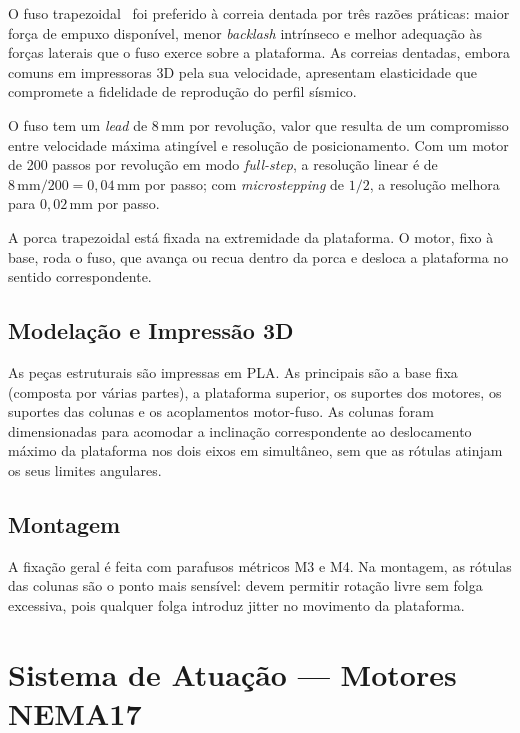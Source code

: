 O fuso trapezoidal~\cite{Fillment3DVarao} foi preferido à correia dentada por três razões práticas: maior força de empuxo disponível, menor \textit{backlash} intrínseco e melhor adequação às forças laterais que o fuso exerce sobre a plataforma. As correias dentadas, embora comuns em impressoras 3D pela sua velocidade, apresentam elasticidade que compromete a fidelidade de reprodução do perfil sísmico.

O fuso tem um \textit{lead} de 8\,mm por revolução, valor que resulta de um compromisso entre velocidade máxima atingível e resolução de posicionamento. Com um motor de 200 passos por revolução em modo \textit{full-step}, a resolução linear é de $8\,\text{mm} / 200 = 0{,}04\,\text{mm}$ por passo; com \textit{microstepping} de $1/2$, a resolução melhora para $0{,}02\,\text{mm}$ por passo.

A porca trapezoidal está fixada na extremidade da plataforma. O motor, fixo à base, roda o fuso, que avança ou recua dentro da porca e desloca a plataforma no sentido correspondente.


\subsection{Modelação e Impressão 3D}
\label{subsec:modelacao-3d}

As peças estruturais são impressas em PLA. As principais são a base fixa (composta por várias partes), a plataforma superior, os suportes dos motores, os suportes das colunas e os acoplamentos motor-fuso. As colunas foram dimensionadas para acomodar a inclinação correspondente ao deslocamento máximo da plataforma nos dois eixos em simultâneo, sem que as rótulas atinjam os seus limites angulares. %


\subsection{Montagem}
\label{subsec:montagem}

A fixação geral é feita com parafusos métricos M3 e M4. Na montagem, as rótulas das colunas são o ponto mais sensível: devem permitir rotação livre sem folga excessiva, pois qualquer folga introduz jitter no movimento da plataforma.


\section{Sistema de Atuação --- Motores NEMA17}
\label{sec:sistema-atuacao}

